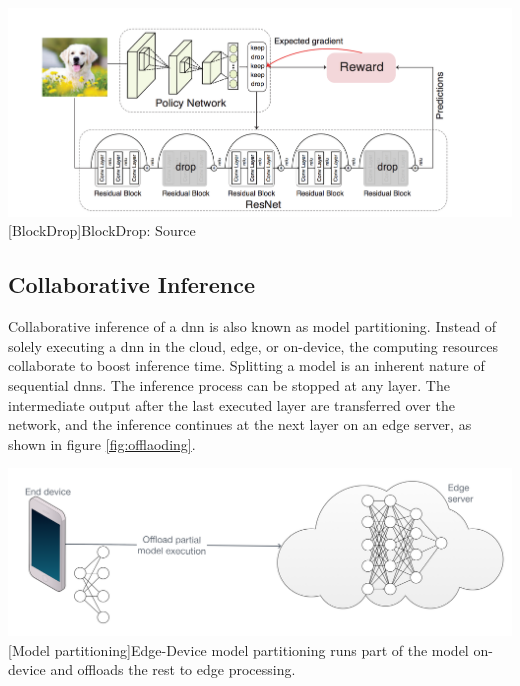 \begin{enumdescript}
	
	\begin{minipage}[t]{\linewidth}    
		\centering
		\includegraphics[width=\linewidth]{figures/models/blockdrop}
		[BlockDrop]{BlockDrop: Source  \cite{wu_blockdrop:_2017}}
	\end{minipage}	
	
	
\end{enumdescript}

\subsection{Collaborative Inference}

Collaborative inference of a \gls{dnn} is also known as model partitioning. Instead of solely executing a \gls{dnn} in the cloud, edge, or on-device, the computing resources collaborate to boost inference time. Splitting a model is an inherent nature of sequential \gls{dnn}s. The inference process can be stopped at any layer. The intermediate output after the last executed layer are transferred over the network, and the inference continues at the next layer on an edge server, as shown in figure \ref{fig:offlaoding}.

\begin{minipage}[t]{\linewidth}    
	\centering
	\includegraphics[width=\linewidth]{figures/models/partitioning}
	[Model partitioning]{Edge-Device model partitioning runs part of the model on-device and offloads the rest to edge processing.}
	\label{fig:offlaoding}
\end{minipage}

